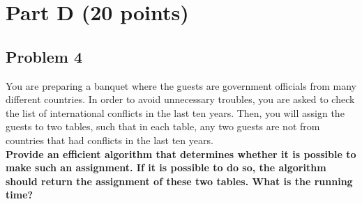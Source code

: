 \documentclass[11pt]{article}
\begin{document}
\section*{Part D (20 points)}

\subsection*{Problem 4} You are preparing a banquet where the
guests are government officials from many different countries. In
order to avoid unnecessary troubles, you are asked to check the list
of international conflicts in the last ten years. Then, you will
assign the guests to two tables, such that in each table, any two
guests are not from countries that had conflicts in the last ten
years.\\

\noindent \textbf{Provide an efficient algorithm that determines whether it is
possible to make such an assignment. If it is possible to do so, the
algorithm should return the assignment of these two tables. What is
the running time?}
\end{document}
